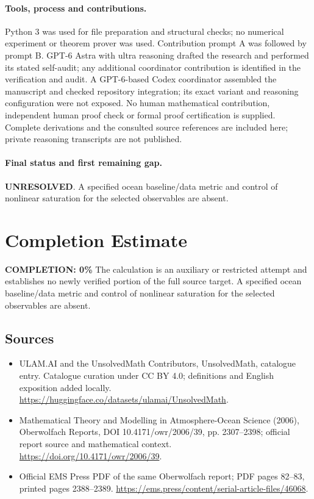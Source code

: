 \documentclass[11pt]{article}
\begin{document}
\paragraph{Tools, process and contributions.}
Python 3 was used for file preparation and structural checks; no numerical experiment or theorem prover was used. Contribution prompt A was followed by prompt B. GPT-6 Astra with ultra reasoning drafted the research and performed its stated self-audit; any additional coordinator contribution is identified in the verification and audit. A GPT-6-based Codex coordinator assembled the manuscript and checked repository integration; its exact variant and reasoning configuration were not exposed. No human mathematical contribution, independent human proof check or formal proof certification is supplied. Complete derivations and the consulted source references are included here; private reasoning transcripts are not published.

\paragraph{Final status and first remaining gap.}
\textbf{UNRESOLVED}. A specified ocean baseline/data metric and control of nonlinear saturation for the selected observables are absent.

\section{Completion Estimate}
\noindent\textbf{COMPLETION: 0\%}
The calculation is an auxiliary or restricted attempt and establishes no newly verified portion of the full source target. A specified ocean baseline/data metric and control of nonlinear saturation for the selected observables are absent.

\subsection{Sources}
\begin{itemize}
\item[\hypertarget{source:statement:1}{S1}] ULAM.AI and the UnsolvedMath Contributors, UnsolvedMath, catalogue entry. Catalogue curation under CC BY 4.0; definitions and English exposition added locally.
\url{https://huggingface.co/datasets/ulamai/UnsolvedMath}.
\item[\hypertarget{source:statement:2}{S2}] Mathematical Theory and Modelling in Atmosphere-Ocean Science (2006), Oberwolfach Reports, DOI 10.4171/owr/2006/39, pp. 2307--2398; official report source and mathematical context.
\url{https://doi.org/10.4171/owr/2006/39}.
\item[\hypertarget{source:statement:3}{S3}] Official EMS Press PDF of the same Oberwolfach report; PDF pages 82--83, printed pages 2388--2389.
\url{https://ems.press/content/serial-article-files/46068}.
\end{itemize}
\label{end:statement}
\end{document}
